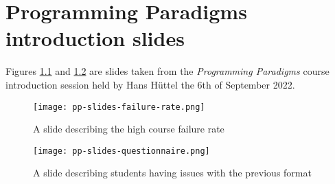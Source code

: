 \chapter{Programming Paradigms introduction slides} \label{chap:PP-intro}
Figures \ref{fig:PP-slide-failure-rate} and \ref{fig:PP-slide-questionnaire} are slides taken from the \textit{Programming Paradigms} course introduction session held by Hans Hüttel the 6th of September 2022.

\begin{figure}[H]
	\texttt{[image: pp-slides-failure-rate.png]}
	\centering
	\caption{A slide describing the high course failure rate}
	\label{fig:PP-slide-failure-rate}
\end{figure}

\begin{figure}[H]
	\texttt{[image: pp-slides-questionnaire.png]}
	\centering
	\caption{A slide describing students having issues with the previous format}
	\label{fig:PP-slide-questionnaire}
\end{figure}